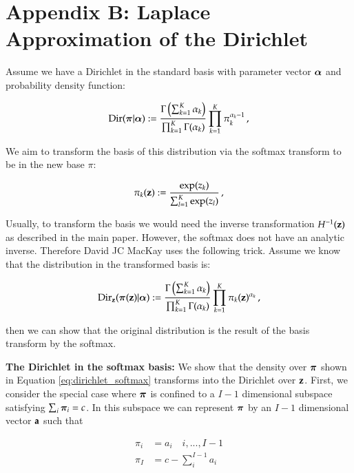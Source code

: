 \section*{Appendix B: Laplace Approximation of the Dirichlet}
\label{sec:LADirichlet}



Assume we have a Dirichlet in the standard basis with parameter vector ${\boldsymbol{\alpha}}$ and probability density function:

\begin{equation}\label{eq:dirichlet}
    \mathrm{Dir}(\boldsymbol{\pi} | {\boldsymbol{\alpha}}) := \frac{\Gamma \left( \sum_{k=1}^K \alpha_k \right)}{\prod_{k=1}^K \Gamma(\alpha_k)} \prod_{k=1}^K \pi_k^{\alpha_k-1} \, ,
\end{equation}

We aim to transform the basis of this distribution via the softmax transform to be in the new base $\pi$:

\begin{equation}\label{eq:softmax}
    \pi_k(\mathbf{z}) := \frac{\exp(z_k)}{\sum_{l=1}^K \exp(z_l)} \, ,
\end{equation}

Usually, to transform the basis we would need the inverse transformation $H^{-1}(\mathbf{z})$ as described in the main paper. However, the softmax does not have an analytic inverse. Therefore David JC MacKay uses the following trick. Assume we know that the distribution in the transformed basis is:

\begin{equation}\label{eq:dirichlet_softmax}
    \mathrm{Dir}_{\mathbf{z}}(\boldsymbol{\pi}(\mathbf{z}) | {\boldsymbol{\alpha}}) := \frac{\Gamma \left( \sum_{k=1}^K \alpha_k \right)}{\prod_{k=1}^K \Gamma(\alpha_k)} \prod_{k=1}^K \pi_k(\mathbf{z})^{\alpha_k} \, ,
\end{equation}

then we can show that the original distribution is the result of the basis transform by the softmax. 

\textbf{The Dirichlet in the softmax basis: } We show that the density over $\boldsymbol{\pi}$ shown in Equation \ref{eq:dirichlet_softmax} transforms into the Dirichlet over $\mathbf{z}$. First, we consider the special case where $\boldsymbol{\pi}$ is confined to a $I-1$ dimensional subspace satisfying $\sum_i \boldsymbol{\pi}_i = c$. In this subspace we can represent $\boldsymbol{\pi}$ by an $I - 1$ dimensional vector $\mathbf{a}$ such that 

\begin{align}
    \pi_i &= a_i \quad i,...,I-1 \\
    \pi_I &= c - \sum_i^{I-1} a_i
\end{align}

